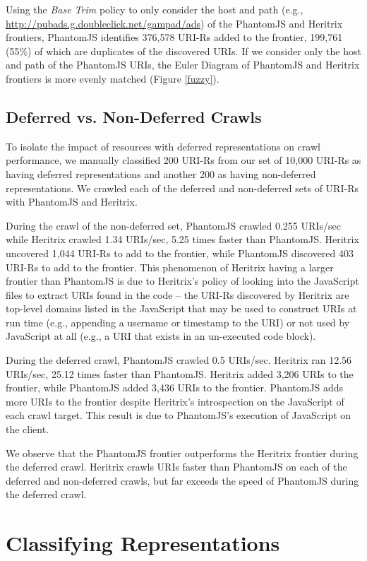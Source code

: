 \documentclass{sig-alternate}
\begin{document}
Using the \emph{Base Trim} policy to only consider the host and path (e.g., \url{http://pubads.g.doubleclick.net/gampad/ads}) of the PhantomJS and Heritrix frontiers, PhantomJS identifies 376,578 URI-Rs added to the frontier, 199,761 (55\%) of which are duplicates of the discovered URIs. If we consider only the host and path of the PhantomJS URIs, the Euler Diagram of PhantomJS and Heritrix frontiers is more evenly matched (Figure \ref{fuzzy}).


\subsection{Deferred vs. Non-Deferred Crawls}
\label{deferVnon}
To isolate the impact of resources with deferred representations on crawl performance, we manually classified 200 URI-Rs from our set of 10,000 URI-Rs as having deferred representations and another 200 as having non-deferred representations. We crawled each of the deferred and non-deferred sets of URI-Rs with PhantomJS and Heritrix. 

During the crawl of the non-deferred set, PhantomJS crawled 0.255 URIs/sec while Heritrix crawled 1.34 URIs/sec, 5.25 times faster than PhantomJS. Heritrix uncovered 1,044 URI-Rs to add to the frontier, while PhantomJS discovered 403 URI-Rs to add to the frontier. This phenomenon of Heritrix having a larger frontier than PhantomJS is due to Heritrix's policy of looking into the JavaScript files to extract URIs found in the code -- the URI-Rs discovered by Heritrix are top-level domains listed in the JavaScript that may be used to construct URIs at run time (e.g., appending a username or timestamp to the URI) or not used by JavaScript at all (e.g., a URI that exists in an un-executed code block). 

During the deferred crawl, PhantomJS crawled 0.5 URIs/sec. Heritrix ran 12.56 URIs/sec, 25.12 times faster than PhantomJS. Heritrix added 3,206 URIs to the frontier, while PhantomJS added 3,436 URIs to the frontier. PhantomJS adds more URIs to the frontier despite Heritrix's introspection on the JavaScript of each crawl target. This result is due to PhantomJS's execution of JavaScript on the client.

We observe that the PhantomJS frontier outperforms the Heritrix frontier during the deferred crawl. Heritrix crawls URIs faster than PhantomJS on each of the deferred and non-deferred crawls, but far exceeds the speed of PhantomJS during the deferred crawl.

\section{Classifying Representations}
\label{classifying}
\end{document}
